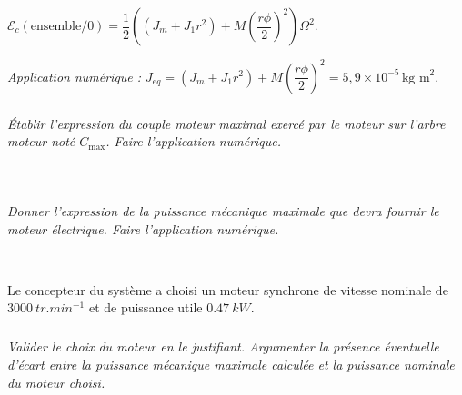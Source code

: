 \documentclass[10pt,fleqn]{article} %
\begin{document}
\begin{multicols}{2}
\begin{corrige}
$\mathcal{E}_c\left(\text{ensemble}/0\right) = \dfrac{1}{2}\left(\left( J_m  + J_1 r^2\right)+   M \left(\dfrac{r\phi}{2}\right)^2\right)\Omega^2  $.


\textit{Application numérique : }
$J_{eq}=\left( J_m  + J_1 r^2\right)+   M \left(\dfrac{r\phi}{2}\right)^2 =5,9\times 10^{-5} \, \text{kg m}^2$.
\end{corrige}
\else
\fi

\subparagraph{}\textit{Établir l’expression du couple moteur maximal exercé par le moteur sur l’arbre moteur noté $C_{\text{max}}$. Faire l’application numérique.}
\ifprof
\begin{corrige}~\\
\end{corrige}
\else
\fi


\subparagraph{}\textit{Donner l’expression de la puissance mécanique maximale que devra fournir le moteur électrique. Faire l’application numérique.}
\ifprof
\begin{corrige}~\\
\end{corrige}
\else
\fi

Le concepteur du système a choisi un moteur synchrone de vitesse nominale de $\SI{3000}{tr.min^{-1}}$ et de puissance utile $\SI{0,47}{kW}$.

\subparagraph{}\textit{Valider le choix du moteur en le justifiant. Argumenter la présence éventuelle d’écart entre la puissance mécanique maximale calculée et la puissance nominale du moteur choisi.}
\ifprof
\begin{corrige}~\\
\end{corrige}
\else
\fi



\end{multicols}
\end{document}
